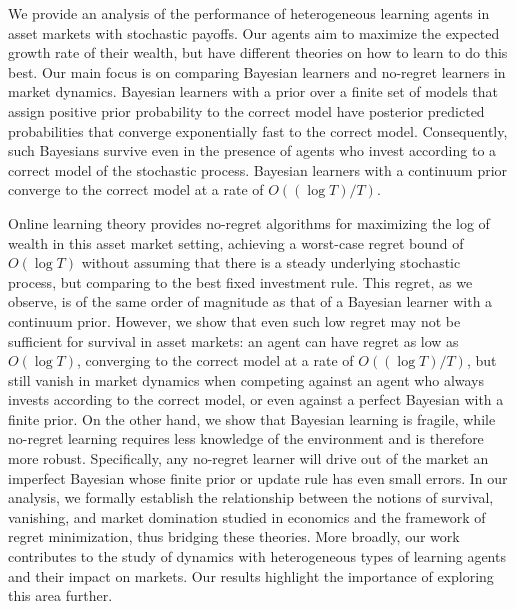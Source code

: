 We provide an analysis of the performance of heterogeneous learning agents in asset markets with stochastic payoffs. Our agents aim to maximize the expected growth rate of their wealth, but have different theories on how to learn to do this best. Our main focus is on comparing Bayesian learners and no-regret learners in market dynamics. Bayesian learners with a prior over a finite set of models that assign positive prior probability to the correct model have posterior predicted probabilities that converge exponentially fast to the correct model. Consequently, such Bayesians survive even in the presence of agents who invest according to a correct model of the stochastic process. Bayesian learners with a continuum prior converge to the correct model at a rate of $O((\log T) / T)$. 

Online learning theory provides no-regret algorithms for maximizing the log of wealth in this asset market setting, achieving a worst-case regret bound of $O(\log T)$ without assuming that there is a steady underlying stochastic process, but comparing to the best fixed investment rule. This regret, as we observe, is of the same order of magnitude as that of a Bayesian learner with a continuum prior. However, we show that even such low regret may not be sufficient for survival in asset markets: an agent can have regret as low as $O(\log T)$, converging to the correct model at a rate of $O((\log T) / T)$, but still vanish in market dynamics when competing against an agent who always invests according to the correct model, or even against a perfect Bayesian with a finite prior. On the other hand, we show that Bayesian learning is fragile, while no-regret learning requires less knowledge of the environment and is therefore more robust. Specifically, any no-regret learner will drive out of the market an imperfect Bayesian whose finite prior or update rule has even small errors. In our analysis, we formally establish the relationship between the notions of survival, vanishing, and market domination studied in economics and the framework of regret minimization, thus bridging these theories. More broadly, our work contributes to the study of dynamics with heterogeneous types of learning agents and their impact on markets. Our results highlight the importance of exploring this area further.\\ 
